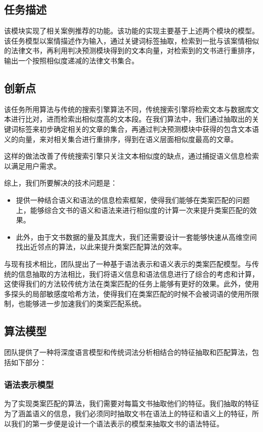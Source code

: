 \subsection{任务描述}
该模块实现了相关案例推荐的功能。该功能的实现主要基于上述两个模块的模型。该任务模型以案情描述作为输入，通过关键词标签抽取，检索到一批与该案情相似的法律文书，再利用判决预测模块得到的文本向量，对检索到的文书进行重排序，输出一个按照相似度递减的法律文书集合。

\subsection{创新点}
该任务所用算法与传统的搜索引擎算法不同，传统搜索引擎将检索文本与数据库文本进行比对，进而检索出相似度高的文本段。在我们算法中，我们通过抽取出的关键词标签来初步确定相关的文章的集合，再通过判决预测模块中获得的包含文本语义的向量，来对相关集合进行重排序，得到在语义层面相似度最高的文章。

这样的做法改善了传统搜索引擎只关注文本相似度的缺点，通过捕捉语义信息检索以满足用户需求。

综上，我们所要解决的技术问题是：
\begin{itemize}
	\item 提供一种结合语义和语法的信息检索框架，使得我们能够在类案匹配的问题上，能够综合文书的语义和语法来进行相似度的计算一次来提升类案匹配的效果。
	\item 此外，由于文书数据的量及其庞大，我们还需要设计一套能够快速从高维空间找出近邻点的算法，以此来提升类案匹配算法的效率。
\end{itemize}
与现有技术相比，团队提出了一种基于语法表示和语义表示的类案匹配模型。与传统的信息抽取的方法相比，我们将语义信息和语法信息进行了综合的考虑和计算，这使得我们的方法较传统方法在类案匹配的任务上能够有更好的效果。此外，使用多探头的局部敏感度哈希方法，使得我们在类案匹配的时候不会被词语的使用所限制，也能够进一步加速我们的类案匹配系统。

\subsection{算法模型}
团队提供了一种将深度语言模型和传统词法分析相结合的特征抽取和匹配算法，包括如下部分：
\subsubsection{语法表示模型}
为了实现类案匹配的算法，我们需要对每篇文书抽取他们的特征。我们抽取的特征为了涵盖语义的信息，我们必须同时抽取文书在语法上的特征和语义上的特征，所以我们的第一步便是设计一个语法表示的模型来抽取文书的语法特征。

